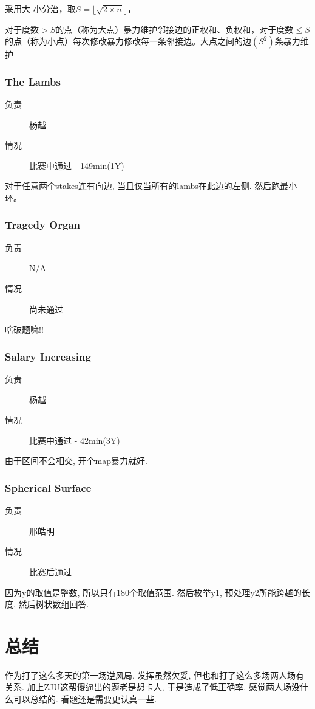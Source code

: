 \documentclass[a4paper, 11pt, nofonts, nocap, fancyhdr]{ctexart}
\newcommand{\problem}[1]{\subsubsection{#1}}
\begin{document}
采用大-小分治，取$S=\lfloor \sqrt{2\times n} \rfloor$，

对于度数$>S$的点（称为大点）暴力维护邻接边的正权和、负权和，对于度数$\leq S$的点（称为小点）每次修改暴力修改每一条邻接边。大点之间的边$(S^2)$条暴力维护

\problem{The Lambs}

\begin{description}
\item[负责] 杨越
\item[情况] 比赛中通过 - 149min(1Y)
\end{description}

对于任意两个stakes连有向边, 当且仅当所有的lambs在此边的左侧. 然后跑最小环。

\problem{Tragedy Organ}

\begin{description}
\item[负责] N/A
\item[情况] 尚未通过
\end{description}

啥破题嘛!!

\problem{Salary Increasing}

\begin{description}
\item[负责] 杨越
\item[情况] 比赛中通过 - 42min(3Y)
\end{description}

由于区间不会相交, 开个map暴力就好.

\problem{Spherical Surface}

\begin{description}
\item[负责] 邢皓明
\item[情况] 比赛后通过
\end{description}

因为y的取值是整数, 所以只有180个取值范围. 然后枚举y1, 预处理y2所能跨越的长度, 然后树状数组回答.

\section{总结}

作为打了这么多天的第一场逆风局, 发挥虽然欠妥, 但也和打了这么多场两人场有关系. 加上ZJU这帮傻逼出的题老是想卡人, 于是造成了低正确率. 感觉两人场没什么可以总结的. 看题还是需要更认真一些.
\end{document}
